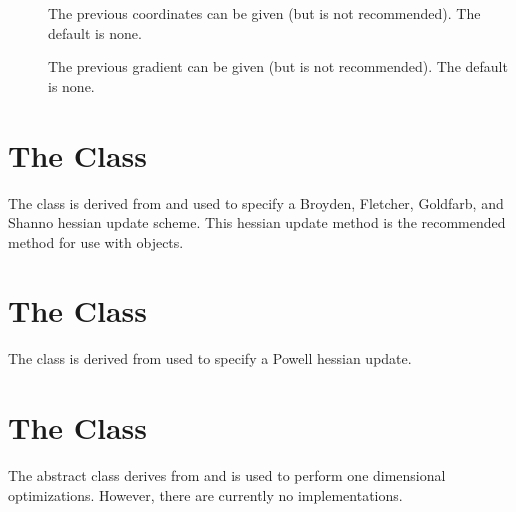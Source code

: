 \begin{description}
  \item[] The previous coordinates can be given (but is not
    recommended).  The default is none.

  \item[] The previous gradient can be given (but is not
    recommended).  The default is none.

\end{description}


\section{The  Class}\label{BFGSUpdate}

The  class is derived from  and used
to specify a Broyden, Fletcher, Goldfarb, and Shanno hessian update scheme.
This hessian update method is the recommended method for use with
 objects.


\section{The  Class}\label{PowellUpdate}

The  class is derived from 
used to specify a Powell hessian update.


\section{The  Class}\label{LineOpt}

The  abstract class derives from  and is
used to perform one dimensional optimizations.  However, there are
currently no implementations.
